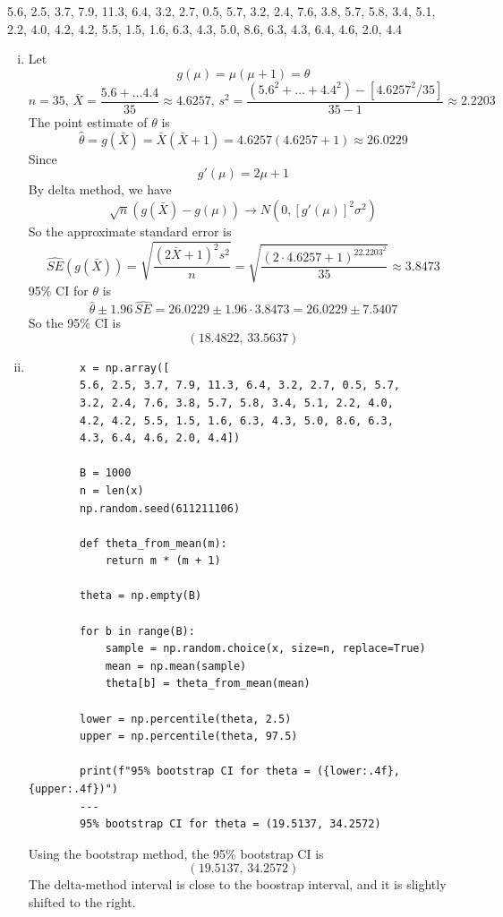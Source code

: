 \documentclass[a4paper, 12pt]{article}  %
\begin{document}
5.6, 2.5, 3.7, 7.9, 11.3, 6.4, 3.2, 2.7, 0.5, 5.7, 3.2, 2.4, 7.6, 3.8, 5.7, 5.8, 3.4,
5.1, 2.2, 4.0, 4.2, 4.2, 5.5, 1.5, 1.6, 6.3, 4.3, 5.0, 8.6, 6.3, 4.3, 6.4, 4.6, 2.0, 4.4
\begin{enumerate}[i.]
    \item Let $$g(\mu)=\mu(\mu+1)=\theta$$
    $$n=35,\,\bar{X}=\frac{5.6+\dots4.4}{35}\approx 4.6257,\,s^2=\frac{(5.6^2+\dots+4.4^2)-[4.6257^2/35]}{35-1}\approx2.2203$$
    The point estimate of $\theta$ is $$\hat{\theta}=g(\bar{X})=\bar{X}(\bar{X}+1)=4.6257(4.6257+1)\approx 26.0229$$
    Since $$g'(\mu)=2\mu+1$$
    By delta method, we have $$\sqrt{n}\left(g(\bar{X})-g(\mu)\right)\rightarrow N(0, [g'(\mu)]^2\sigma^2)$$
    So the approximate standard error is
    $$\widehat{SE}\left(g(\bar{X})\right)
    =\sqrt{\frac{\left(2\bar{X}+1\right)^2s^2}{n}}
    =\sqrt{\frac{\left(2\cdot 4.6257+1\right)^22.2203^2}{35}}\approx 3.8473$$
    95\% CI for $\theta$ is $$\hat{\theta}\pm 1.96\,\widehat{SE}=26.0229\pm 1.96\cdot 3.8473=26.0229\pm 7.5407$$
    So the 95\% CI is $$(18.4822,\,33.5637)$$
    \item 
    \begin{center}
        \begin{verbatim}
        x = np.array([
        5.6, 2.5, 3.7, 7.9, 11.3, 6.4, 3.2, 2.7, 0.5, 5.7,
        3.2, 2.4, 7.6, 3.8, 5.7, 5.8, 3.4, 5.1, 2.2, 4.0,
        4.2, 4.2, 5.5, 1.5, 1.6, 6.3, 4.3, 5.0, 8.6, 6.3,
        4.3, 6.4, 4.6, 2.0, 4.4])

        B = 1000
        n = len(x)
        np.random.seed(611211106)

        def theta_from_mean(m):
            return m * (m + 1)

        theta = np.empty(B)

        for b in range(B):
            sample = np.random.choice(x, size=n, replace=True)
            mean = np.mean(sample)
            theta[b] = theta_from_mean(mean)

        lower = np.percentile(theta, 2.5)
        upper = np.percentile(theta, 97.5)

        print(f"95% bootstrap CI for theta = ({lower:.4f}, {upper:.4f})")
        ---
        95% bootstrap CI for theta = (19.5137, 34.2572)
        \end{verbatim}
    \end{center}
    Using the bootstrap method, the 95\% bootstrap CI is $$(19.5137,\, 34.2572)$$
    The delta-method interval is close to the boostrap interval, and it is slightly shifted to the right.
\end{enumerate}
\end{document}
